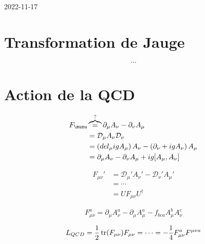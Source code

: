 


2022-11-17

\section*{Transformation de Jauge}


\[ \dotsb \]

\section*{Action de la QCD}


\begin{align*}
	F_{\munu} &\overbrace{=}^{?} \partial_{\mu} A_{\nu} - \partial_{\nu} A_{\mu}\\
&= \mathcal{D}_\mu A_{\nu} \mathcal{D}_\nu\\
&= \left( del_{\mu} igA_\mu \right) A_{\nu} - \left( \partial_{\nu} + ig A_{\nu} \right) A_{\mu} \\
&= \partial_{\mu} A_{\nu} - \partial_{\nu} A_{\mu} + ig [A_{\mu}, A_{\nu} ]  
\end{align*}

\begin{align*}
	F_{\mu\nu} ' &= \mathcal{D}_\mu ' A_{\nu}' - \mathcal{D}_\nu ' A_{\mu} '\\	
							 &= \dotsb\\
							 &= U F_{\mu\nu} U^{\dagger} 
\end{align*}

\[ \boxed{F_{\mu\nu}^{a} = \partial_{\mu} A_{\nu}^{a}- \partial_{\mu} A_{\mu}^{a}- f_{bca} A_{\mu}^{b}A_{\nu}^{c}} \]


\[ L_{QCD} = \frac{1}{2} \tr(F_{\mu\nu} ) F_{\mu\nu}  = \dotsb = - \frac{1}{4} F_{\mu\nu}^{a}F^{\mu\nu a} \]





